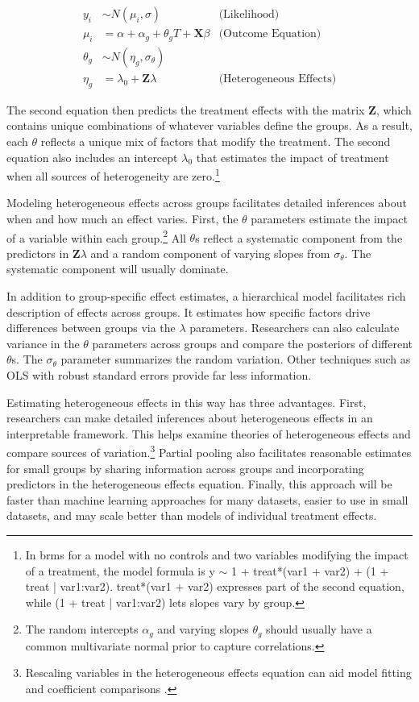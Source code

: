 \documentclass[12pt]{article}
\begin{document}
\begin{equation}
\begin{aligned}
y_i &\sim N(\mu_i, \sigma) &\text{(Likelihood)} \\
\mu_i &= \alpha + \alpha_g + \theta_g \textit{T} + \textbf{X} \beta &\text{(Outcome Equation)}  \\
\theta_g &\sim N(\eta_g, \sigma_\theta) \\ 
\eta_g &= \lambda_0 + \textbf{Z} \lambda &\text{(Heterogeneous Effects)} 
\end{aligned}
\end{equation}


The second equation then predicts the treatment effects with the matrix \textbf{Z}, which contains unique combinations of whatever variables define the groups.  
As a result, each $\theta$ reflects a unique mix of factors that modify the treatment.
The second equation also includes an intercept $\lambda_0$ that estimates the impact of treatment when all sources of heterogeneity are zero.\footnote{In brms for a model with no controls and two variables modifying the impact of a treatment, the model formula is y $\sim$ 1 + treat*(var1 + var2) + (1 + treat | var1:var2). treat*(var1 + var2) expresses part of the second equation, while (1 + treat | var1:var2) lets slopes vary by group.}


Modeling heterogeneous effects across groups facilitates detailed inferences about when and how much an effect varies.
First, the $\theta$ parameters estimate the impact of a variable within each group.\footnote{The random intercepts $\alpha_g$ and varying slopes $\theta_g$ should usually have a common multivariate normal prior to capture correlations.}
All $\theta$s reflect a systematic component from the predictors in \textbf{Z}$\lambda$ and a random component of varying slopes from $\sigma_\theta$. 
The systematic component will usually dominate. 


In addition to group-specific effect estimates, a hierarchical model facilitates rich description of effects across groups. 
It estimates how specific factors drive differences between groups via the $\lambda$ parameters.
Researchers can also calculate variance in the $\theta$ parameters across groups and compare the posteriors of different $\theta$s. 
The $\sigma_\theta$ parameter summarizes the random variation. 
Other techniques such as OLS with robust standard errors provide far less information.


Estimating heterogeneous effects in this way has three advantages.
First, researchers can make detailed inferences about heterogeneous effects in an interpretable framework. 
This helps examine theories of heterogeneous effects and compare sources of variation.\footnote{Rescaling variables in the heterogeneous effects equation can aid model fitting and coefficient comparisons \citep{Gelman2008}.} 
Partial pooling also facilitates reasonable estimates for small groups by sharing information across groups and incorporating predictors in the heterogeneous effects equation. 
Finally, this approach will be faster than machine learning approaches for many datasets, easier to use in small datasets, and may scale better than models of individual treatment effects.
\end{document}

